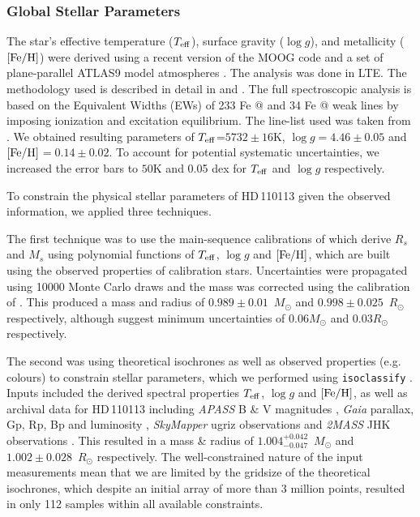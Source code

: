 \documentclass[fleqn,usenatbib]{mnras}
\makeatletter
\newcommand*{\rom}[1]{\expandafter\@slowromancap\romannumeral #1@}
\newcommand{\msun}{\mbox{$M_{\odot}$}}
\newcommand{\rsun}{\mbox{$R_{\odot}$}}
\newcommand{\teff}{$T_{\rm eff}$}
\newcommand{\feh}{\mbox{$\rm [Fe/H]$}}
\newcommand{\logg}{$\log g$}
\newcommand{\Tmstartorres}{ $ 0.989 \pm 0.01 $ }
\newcommand{\Trstartorres}{ $ 0.998 \pm 0.025 $ }
\newcommand{\Tradiso}{ $ 1.002 \pm 0.028 $ }
\newcommand{\Tmassiso}{ $ 1.004^{+0.042}_{-0.047} $ }
\newcommand{\Tstar}{HD\,110113}
\makeatother
\begin{document}
\subsubsection{Global Stellar Parameters}\label{sect:starpars}
The star's effective temperature (\teff{}), surface gravity (\logg{}), and metallicity (\feh{}) were derived using a recent version of the MOOG code \citep{1973ApJ...184..839S} and a set of plane-parallel ATLAS9 model atmospheres  \citep{Kurucz-93}. The analysis was done in LTE. 
The methodology used is described in detail in \citet{2011A&A...533A.141S} and \citet{2013A&A...556A.150S}. 
The full spectroscopic analysis is based on the Equivalent Widths (EWs) of 233 Fe \rom{1} and 34 Fe \rom{2} weak lines by imposing ionization and excitation equilibrium. 
The line-list used was taken from \citet{2008A&A...487..373S}.
We obtained resulting parameters of \teff{}=$5732\pm16$K, \logg{}$=4.46\pm0.05$ and \feh{}$=0.14\pm0.02$.
To account for potential systematic uncertainties, we increased the error bars to $50$K and 0.05 dex for \teff{} and \logg{} respectively.

To constrain the physical stellar parameters of \Tstar{} given the observed information, we applied three techniques.

The first technique was to use the main-sequence calibrations of \citet{2010A&ARv..18...67T} which derive $R_s$ and $M_s$ using polynomial functions of \teff{}, \logg{} and \feh{}, which are built using the observed properties of calibration stars. 
Uncertainties were propagated using 10000 Monte Carlo draws and the mass was corrected using the calibration of \citet{Santos-13}. 
This produced a mass and radius of \Tmstartorres{}\,\msun{} and \Trstartorres{}\,\rsun{} respectively, although \citet{2010A&ARv..18...67T} suggest minimum uncertainties of 0.06\msun{} and 0.03\rsun{} respectively.

The second was using theoretical isochrones \citep[MIST,][]{2016ApJ...823..102C} as well as observed properties (e.g. colours) to constrain stellar parameters, which we performed using \texttt{isoclassify} \citep{2017zndo....573372H,2020AJ....159..280B}.
Inputs included the derived spectral properties \teff{}, \logg{} and \feh{}, as well as archival data for \Tstar{} including {\it APASS} B \& V magnitudes \citep{apass}, {\it Gaia} parallax, Gp, Rp, Bp and luminosity \citep{brown2018gaia}, \textit{SkyMapper} ugriz observations \citep{2020arXiv200810359O} and {\it 2MASS} JHK observations \citep{skrutskie2006two}.
This resulted in a mass \& radius of \Tmassiso{}\,\msun{} and \Tradiso{}\,\rsun{} respectively.
The well-constrained nature of the input measurements mean that we are limited by the gridsize of the theoretical isochrones, which despite an initial array of more than 3 million points, resulted in only 112 samples within all available constraints.
\end{document}
